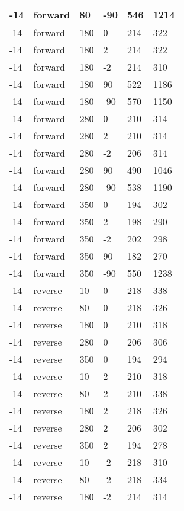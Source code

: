 \begin{longtable}{|l|l|l|l|l|l|}
			-14 & forward & 80 & -90 & 546 & 1214 \\
			\hline
			-14 & forward & 180 & 0 & 214 & 322 \\
			\hline
			-14 & forward & 180 & 2 & 214 & 322 \\
			\hline
			-14 & forward & 180 & -2 & 214 & 310 \\
			\hline
			-14 & forward & 180 & 90 & 522 & 1186 \\
			\hline
			-14 & forward & 180 & -90 & 570 & 1150 \\
			\hline
			-14 & forward & 280 & 0 & 210 & 314 \\
			\hline
			-14 & forward & 280 & 2 & 210 & 314 \\
			\hline
			-14 & forward & 280 & -2 & 206 & 314 \\
			\hline
			-14 & forward & 280 & 90 & 490 & 1046 \\
			\hline
			-14 & forward & 280 & -90 & 538 & 1190 \\
			\hline
			-14 & forward & 350 & 0 & 194 & 302 \\
			\hline
			-14 & forward & 350 & 2 & 198 & 290 \\
			\hline
			-14 & forward & 350 & -2 & 202 & 298 \\
			\hline
			-14 & forward & 350 & 90 & 182 & 270 \\
			\hline
			-14 & forward & 350 & -90 & 550 & 1238 \\
			\hline
			-14 & reverse & 10 & 0 & 218 & 338 \\
			\hline
			-14 & reverse & 80 & 0 & 218 & 326 \\
			\hline
			-14 & reverse & 180 & 0 & 210 & 318 \\
			\hline
			-14 & reverse & 280 & 0 & 206 & 306 \\
			\hline
			-14 & reverse & 350 & 0 & 194 & 294 \\
			\hline
			-14 & reverse & 10 & 2 & 210 & 318 \\
			\hline
			-14 & reverse & 80 & 2 & 210 & 338 \\
			\hline
			-14 & reverse & 180 & 2 & 218 & 326 \\
			\hline
			-14 & reverse & 280 & 2 & 206 & 302 \\
			\hline
			-14 & reverse & 350 & 2 & 194 & 278 \\
			\hline
			-14 & reverse & 10 & -2 & 218 & 310 \\
			\hline
			-14 & reverse & 80 & -2 & 218 & 334 \\
			\hline
			-14 & reverse & 180 & -2 & 214 & 314 \\

\end{longtable}
